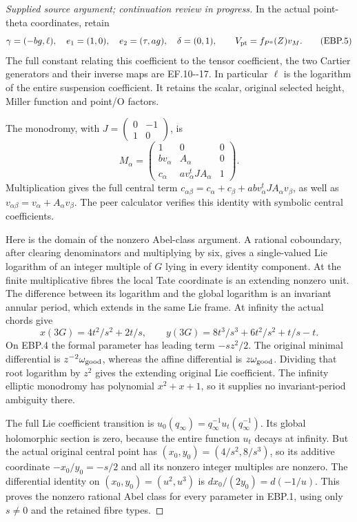 \begin{proof}[Supplied source argument; continuation review in progress]
\par\nobreak

In the actual point-theta coordinates, retain
\[
 \gamma=(-bg,\ell),\quad e_1=(1,0),\quad e_2=(\tau,ag),
 \quad\delta=(0,1),\qquad V_{\rm pt}=f_{P^a}(Z)v_M.
 \tag{EBP.5}
\]
The full constant relating this coefficient to the tensor coefficient,
the two Cartier generators and their inverse maps are EF.10-\/-17.
In particular \(\ell\) is the logarithm of the entire suspension
coefficient. It retains the scalar, original selected height, Miller
function and point/O factors.

The monodromy, with \(J=\left(\begin{smallmatrix}0&-1\\1&0\end{smallmatrix}\right)\), is
\[
 M_\alpha=\begin{pmatrix}
 1&0&0\\ bv_\alpha&A_\alpha&0\\
 c_\alpha&a v_\alpha^tJA_\alpha&1
 \end{pmatrix}.
 \tag{EBP.6}
\]
Multiplication gives the full central term
\(c_{\alpha\beta}=c_\alpha+c_\beta+
abv_\alpha^tJA_\alpha v_\beta\), as well as
\(v_{\alpha\beta}=v_\alpha+A_\alpha v_\beta\). The peer
calculator verifies this identity with symbolic central coefficients.

Here is the domain of the nonzero Abel-class argument. A rational
coboundary, after clearing denominators and multiplying by six, gives
a single-valued Lie logarithm of an integer multiple of \(G\) lying in
every identity component. At the finite multiplicative fibres the local
Tate coordinate is an extending nonzero unit. The difference between
its logarithm and the global logarithm is an invariant annular period,
which extends in the same Lie frame. At infinity the actual chords give
\[
 x(3G)=4t^2/s^2+2t/s,\qquad
 y(3G)=8t^3/s^3+6t^2/s^2+t/s-t.
 \tag{EBP.7}
\]
On EBP.4 the formal parameter has leading term \(-sz^2/2\).
The original minimal differential is \(z^{-2}\omega_{\rm good}\),
whereas the affine differential is \(z\omega_{\rm good}\).
Dividing that root logarithm by \(z^2\) gives the extending original
Lie coefficient. The infinity elliptic monodromy has polynomial
\(x^2+x+1\), so it supplies no invariant-period ambiguity there.

The full Lie coefficient transition is
\(u_0(q_\infty)=q_\infty^{-1}u_t(q_\infty^{-1})\). Its global
holomorphic section is zero, because the entire function \(u_t\)
decays at infinity. But the actual original central point has
\((x_0,y_0)=(4/s^2,8/s^3)\), so its additive coordinate
\(-x_0/y_0=-s/2\) and all its nonzero integer multiples are nonzero.
The differential identity on \((x_0,y_0)=(u^2,u^3)\) is
\(dx_0/(2y_0)=d(-1/u)\). This proves the nonzero rational Abel class
for every parameter in EBP.1, using only \(s\ne0\) and the retained
fibre types.


\end{proof}
